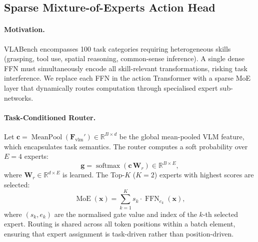 \documentclass[10pt,twocolumn]{article}
\newcommand{\Fvlm}{\mathbf{F}_{\mathrm{vlm}}}
\begin{document}
\subsection{Sparse Mixture-of-Experts Action Head}
\label{sec:method:moe}


\paragraph{Motivation.}
VLABench encompasses 100 task categories requiring heterogeneous skills
(grasping, tool use, spatial reasoning, common-sense inference).
A single dense FFN must simultaneously encode all skill-relevant
transformations, risking task interference.
We replace each FFN in the action Transformer with a sparse MoE layer
that dynamically routes computation through specialised expert sub-networks.

\paragraph{Task-Conditioned Router.}
Let $\mathbf{c} = \operatorname{MeanPool}(\Fvlm') \in \mathbb{R}^{B \times d}$
be the global mean-pooled VLM feature, which encapsulates task semantics.
The router computes a soft probability over $E{=}4$ experts:
\begin{equation}
  \mathbf{g} = \operatorname{softmax}(\mathbf{c}\,\mathbf{W}_r)
  \in \mathbb{R}^{B \times E},
  \label{eq:moe_gate}
\end{equation}
where $\mathbf{W}_r \in \mathbb{R}^{d \times E}$ is learned.
The Top-$K$ ($K{=}2$) experts with highest scores are selected:
\begin{equation}
  \operatorname{MoE}(\mathbf{x}) =
  \sum_{k=1}^{K} s_k \cdot \operatorname{FFN}_{e_k}(\mathbf{x}),
  \label{eq:moe_output}
\end{equation}
where $(s_k, e_k)$ are the normalised gate value and index of the $k$-th
selected expert. Routing is shared across all token positions within a
batch element, ensuring that expert assignment is task-driven rather than
position-driven.
\end{document}
